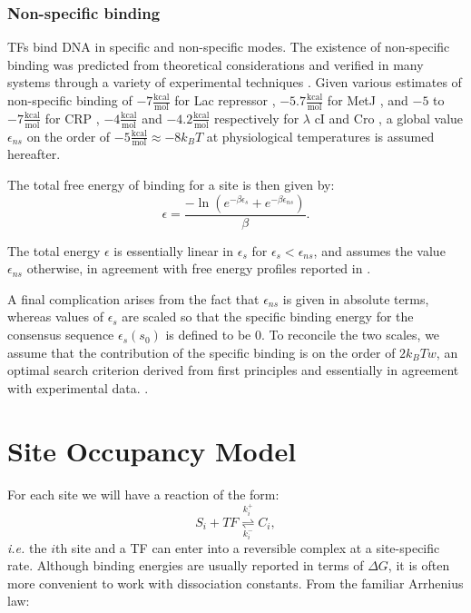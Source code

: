 \documentclass{article}
\begin{document}
\subsubsection{Non-specific binding}
TFs bind DNA in specific and non-specific modes.  The existence of
non-specific binding was predicted from theoretical considerations
\cite{kaohuang77} and verified in many systems through a variety of
experimental techniques \cite{revzin90}.  Given various estimates of
non-specific binding of $-7\frac{\mathrm{kcal}}{\textrm{mol}}$ for Lac
repressor \cite{wang77}, $-5.7\frac{\mathrm{kcal}}{\textrm{mol}}$ for
MetJ \cite{augustus10}, and $-5$ to $-7
\frac{\mathrm{kcal}}{\textrm{mol}}$ for CRP \cite{takahashi79},
$-4\frac{\mathrm{kcal}}{\textrm{mol}}$ and $-4.2
\frac{\mathrm{kcal}}{\textrm{mol}}$ respectively for $\lambda$ cI and
Cro \cite{bakk2004}, a global value $\epsilon_{ns}$ on the order of
$-5\frac{\mathrm{kcal}}{\textrm{mol}}\approx -8 k_BT$ at physiological
temperatures is assumed hereafter.

The total free energy of binding for a site is then given by:
\begin{equation}
  \epsilon = \frac{-\ln(e^{-\beta \epsilon_s} + e^{-\beta \epsilon_{ns}})}{\beta}.\label{eq:totalbindingenergy}
\end{equation}

  The total energy $\epsilon$ is essentially linear in $\epsilon_s$ for $\epsilon_s < \epsilon_{ns}$, and assumes the value $\epsilon_{ns}$ otherwise, in agreement with free energy profiles reported in \cite{maerkl2007}.

A final complication arises from the fact that $\epsilon_{ns}$ is
given in absolute terms, whereas values of $\epsilon_s$ are scaled so
that the specific binding energy for the consensus sequence
$\epsilon_s(s_0)$ is defined to be 0.  To reconcile the two scales, we
assume that the contribution of the specific binding is on the order
of $2k_BT w$, an optimal search criterion derived from first
principles \cite{gerland02} and essentially in agreement with
experimental data.  \cite{bakk2004}.
\section{Site Occupancy Model}
For each site we will have a reaction of the form:
\begin{equation}
  \label{eq:s_reaction}
  S_i + TF \overset{k^+_i}{\underset{k^-_i}{\rightleftharpoons}} C_i,
\end{equation}
\textit{i.e.} the $i$th site and a TF can enter into a reversible
complex at a site-specific rate.  Although binding energies are
usually reported in terms of $\Delta G$, it is often more convenient
to work with dissociation constants.  From the familiar Arrhenius law:
\end{document}
